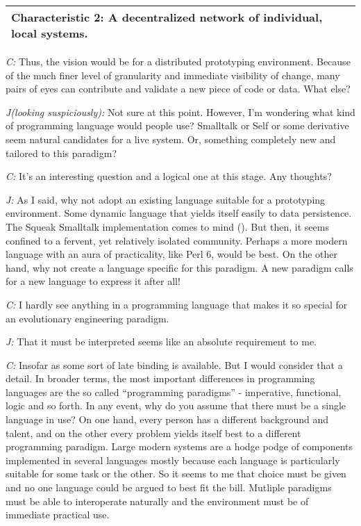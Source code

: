 \documentclass[10pt]{sigplanconf}
\begin{document}
\begin{tabular}{|p{7cm}|}
\hline
\textbf{Characteristic 2: A decentralized network of individual, local systems. }
\\
\hline
\end{tabular}

\bigskip

\emph{C:} Thus, the vision would be for a distributed prototyping environment. Because of the much finer level of granularity and immediate visibility of change, many pairs of eyes can contribute and validate a new piece of code or data. What else?

\emph{J(looking suspiciously):} Not sure at this point. However, I'm wondering what kind of programming language would people use? Smalltalk or Self or some derivative seem natural candidates for a live system. Or, something completely new and tailored to this paradigm?

\emph{C:} It's an interesting question and a logical one at this stage. Any thoughts?

\emph{J:} As I said, why not adopt an existing language suitable for a prototyping environment. Some dynamic language that yields itself easily to data persistence. The Squeak Smalltalk implementation comes to mind (\cite{squeak}). But then, it seems confined to a fervent, yet relatively isolated community. Perhaps a more modern language with an aura of practicality, like Perl 6, would be best. On the other hand, why not create a language specific for this paradigm. A new paradigm calls for a new language to express it after all!

\emph{C:} I hardly see anything in a programming language that makes it so special for an evolutionary engineering paradigm.

\emph{J:} That it must be interpreted seems like an absolute requirement to me.

\emph{C:} Insofar as some sort of late binding is available. But I would consider that a detail. In broader terms, the most important differences in programming languages are the so called ``programming paradigms'' - imperative, functional, logic and so forth. In any event, why do you assume that there must be a single language in use? On one hand, every person has a different background and talent, and on the other every problem yields itself best to a different programming paradigm. Large modern systems are a hodge podge of components implemented in several languages mostly because each language is particularly suitable for some task or the other. So it seems to me that choice must be given and no one language could be argued to best fit the bill. Mutliple paradigms must be able to interoperate naturally and the environment must be of immediate practical use.
\end{document}
